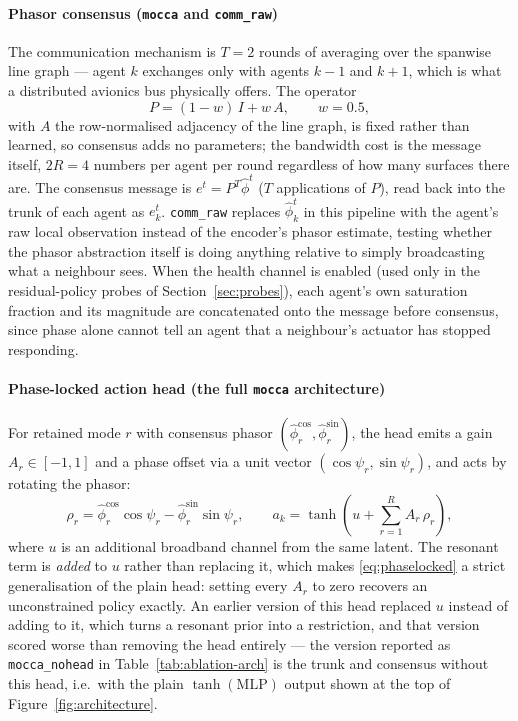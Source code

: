 \documentclass[preprint,11pt,authoryear]{elsarticle}
\begin{document}
\paragraph{Phasor consensus (\texttt{mocca} and \texttt{comm\_raw})}
The communication mechanism is $T{=}2$ rounds of averaging over the spanwise
line graph --- agent $k$ exchanges only with agents $k{-}1$ and $k{+}1$, which
is what a distributed avionics bus physically offers. The operator
\begin{equation}
P = (1-w)\,I + w\,A, \qquad w = 0.5,
\label{eq:consensus-operator}
\end{equation}
with $A$ the row-normalised adjacency of the line graph, is fixed rather than
learned, so consensus adds no parameters; the bandwidth cost is the message
itself, $2R{=}4$ numbers per agent per round regardless of how many surfaces
there are. The consensus message is $e^t = P^T \hat\phi^t$ ($T$ applications of
$P$), read back into the trunk of each agent as $e_k^t$.
\texttt{comm\_raw} replaces $\hat\phi_k^t$ in this pipeline with the agent's raw
local observation instead of the encoder's phasor estimate, testing whether the
phasor abstraction itself is doing anything relative to simply broadcasting
what a neighbour sees. When the health channel is enabled (used only in the
residual-policy probes of Section~\ref{sec:probes}), each agent's own
saturation fraction and its magnitude are concatenated onto the message before
consensus, since phase alone cannot tell an agent that a neighbour's actuator
has stopped responding.

\paragraph{Phase-locked action head (the full \texttt{mocca} architecture)}
For retained mode $r$ with consensus phasor $(\hat\phi_r^{\cos}, \hat\phi_r^{\sin})$,
the head emits a gain $A_r \in [-1,1]$ and a phase offset via a unit vector
$(\cos\psi_r, \sin\psi_r)$, and acts by rotating the phasor:
\begin{equation}
\rho_r = \hat\phi_r^{\cos}\cos\psi_r - \hat\phi_r^{\sin}\sin\psi_r, \qquad
a_k = \tanh\!\left(u + \sum_{r=1}^{R} A_r\, \rho_r\right),
\label{eq:phaselocked}
\end{equation}
where $u$ is an additional broadband channel from the same latent. The resonant
term is \emph{added} to $u$ rather than replacing it, which makes
\eqref{eq:phaselocked} a strict generalisation of the plain head: setting every
$A_r$ to zero recovers an unconstrained policy exactly. An earlier version of
this head replaced $u$ instead of adding to it, which turns a resonant prior
into a restriction, and that version scored worse than removing the head
entirely --- the version reported as \texttt{mocca\_nohead} in
Table~\ref{tab:ablation-arch} is the trunk and consensus without this head, i.e.\
with the plain $\tanh(\mathrm{MLP})$ output shown at the top of
Figure~\ref{fig:architecture}.
\end{document}

